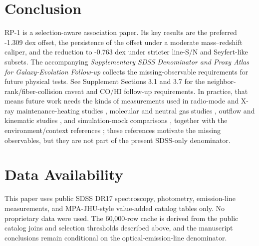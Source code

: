 \documentclass[twocolumn]{aastex631}
\begin{document}
\section{Conclusion}
RP-1 is a selection-aware association paper. Its key results are the preferred -1.309 dex offset, the persistence of the offset under a moderate mass--redshift caliper, and the reduction to -0.763 dex under stricter line-S/N and Seyfert-like subsets. The accompanying \emph{Supplementary SDSS Denominator and Proxy Atlas for Galaxy-Evolution Follow-up} collects the missing-observable requirements for future physical tests. See Supplement Sections 3.1 and 3.7 for the neighbor-rank/fiber-collision caveat and CO/HI follow-up requirements.
In practice, that means future work needs the kinds of measurements used in radio-mode and X-ray maintenance-heating studies \citep{best2005,fabian2012,mcnamara2007,heckmanbest2014,lamassa2013}, molecular and neutral gas studies \citep{xcoldgass2017,xgass2018}, outflow and kinematic studies \citep{veilleux2005,cicone2014,carniani2017,fiore2017}, and simulation-mock comparisons \citep{simba2019,tng2019,eagle2015}, together with the environment/context references \citep{peng2010,piotrowska2022,wetzel2013,dekel2006}; these references motivate the missing observables, but they are not part of the present SDSS-only denominator.

\section*{Data Availability}
This paper uses public SDSS DR17 spectroscopy, photometry, emission-line measurements, and MPA-JHU-style value-added catalog tables only. No proprietary data were used. The 60,000-row cache is derived from the public catalog joins and selection thresholds described above, and the manuscript conclusions remain conditional on the optical-emission-line denominator.

\end{document}
